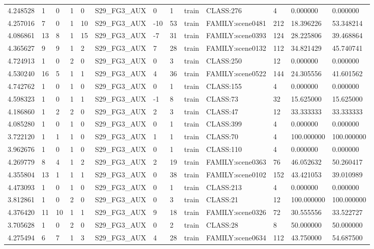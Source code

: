 \begin{tabular}{lllllllllllll}
4.248528 & 1 & 0 & 1 & 0 & S29\_FG3\_AUX & 0 & 1 & train & CLASS:276 & 4 & 0.000000 & 0.000000 \\
4.257016 & 7 & 0 & 1 & 10 & S29\_FG3\_AUX & -10 & 53 & train & FAMILY:scene0481 & 212 & 18.396226 & 53.348214 \\
4.086861 & 13 & 8 & 1 & 15 & S29\_FG3\_AUX & -7 & 31 & train & FAMILY:scene0393 & 124 & 28.225806 & 39.468864 \\
4.365627 & 9 & 9 & 1 & 2 & S29\_FG3\_AUX & 7 & 28 & train & FAMILY:scene0132 & 112 & 34.821429 & 45.740741 \\
4.724913 & 1 & 0 & 2 & 0 & S29\_FG3\_AUX & 0 & 3 & train & CLASS:250 & 12 & 0.000000 & 0.000000 \\
4.530240 & 16 & 5 & 1 & 1 & S29\_FG3\_AUX & 4 & 36 & train & FAMILY:scene0522 & 144 & 24.305556 & 41.601562 \\
4.742762 & 1 & 0 & 1 & 0 & S29\_FG3\_AUX & 0 & 1 & train & CLASS:155 & 4 & 0.000000 & 0.000000 \\
4.598323 & 1 & 0 & 1 & 1 & S29\_FG3\_AUX & -1 & 8 & train & CLASS:73 & 32 & 15.625000 & 15.625000 \\
4.186860 & 1 & 2 & 2 & 0 & S29\_FG3\_AUX & 2 & 3 & train & CLASS:47 & 12 & 33.333333 & 33.333333 \\
4.085280 & 1 & 0 & 1 & 0 & S29\_FG3\_AUX & 0 & 1 & train & CLASS:399 & 4 & 0.000000 & 0.000000 \\
3.722120 & 1 & 1 & 1 & 0 & S29\_FG3\_AUX & 1 & 1 & train & CLASS:70 & 4 & 100.000000 & 100.000000 \\
3.962676 & 1 & 0 & 1 & 0 & S29\_FG3\_AUX & 0 & 1 & train & CLASS:110 & 4 & 0.000000 & 0.000000 \\
4.269779 & 8 & 4 & 1 & 2 & S29\_FG3\_AUX & 2 & 19 & train & FAMILY:scene0363 & 76 & 46.052632 & 50.260417 \\
4.355804 & 13 & 1 & 1 & 1 & S29\_FG3\_AUX & 0 & 38 & train & FAMILY:scene0102 & 152 & 43.421053 & 39.010989 \\
4.473093 & 1 & 0 & 1 & 0 & S29\_FG3\_AUX & 0 & 1 & train & CLASS:213 & 4 & 0.000000 & 0.000000 \\
3.812861 & 1 & 0 & 2 & 0 & S29\_FG3\_AUX & 0 & 3 & train & CLASS:21 & 12 & 100.000000 & 100.000000 \\
4.376420 & 11 & 10 & 1 & 1 & S29\_FG3\_AUX & 9 & 18 & train & FAMILY:scene0326 & 72 & 30.555556 & 33.522727 \\
3.705628 & 1 & 0 & 2 & 0 & S29\_FG3\_AUX & 0 & 2 & train & CLASS:28 & 8 & 50.000000 & 50.000000 \\
4.275494 & 6 & 7 & 1 & 3 & S29\_FG3\_AUX & 4 & 28 & train & FAMILY:scene0634 & 112 & 43.750000 & 54.687500 \\

\end{tabular}
